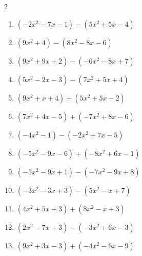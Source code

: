 \begin{multicols}{2}
\begin{enumerate}
  \item $(-2x^{2}-7x-1)-(5x^{2}+5x-4)$


  \item $(9x^{2}+4)-(8x^{2}-8x-6)$


  \item $(9x^{2}+9x+2)-(-6x^{2}-8x+7)$


  \item $(5x^{2}-2x-3)-(7x^{2}+5x+4)$


  \item $(9x^{2}+x+4)+(5x^{2}+5x-2)$


  \item $(7x^{2}+4x-5)+(-7x^{2}+8x-6)$

        \phantom{$=12x-11$}

  \item $(-4x^{2}-1)-(-2x^{2}+7x-5)$


  \item $(-5x^{2}-9x-6)+(-8x^{2}+6x-1)$


  \item $(-5x^{2}-9x+1)-(-7x^{2}-9x+8)$


  \item $(-3x^{2}-3x+3)-(5x^{2}-x+7)$


  \item $(4x^{2}+5x+3)+(8x^{2}-x+3)$


\columnbreak %

\resetques

  \item $(2x^{2}-7x+3)-(-3x^{2}+6x-3)$


  \item $(9x^{2}+3x-3)+(-4x^{2}-6x-9)$



\end{enumerate}
\end{multicols}
